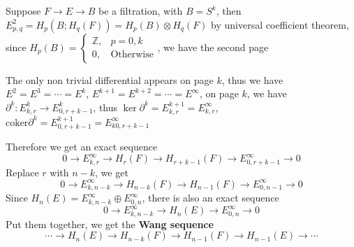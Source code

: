 \documentclass[../main.tex]{subfiles}
\begin{document}
\begin{example}
Suppose $F\to E\to B$ be a filtration, with $B=S^k$, then $E^2_{p,q}=H_p(B;H_q(F))=H_p(B)\otimes H_q(F)$ by universal coefficient theorem, since $H_p(B)=\begin{cases}
\mathbb Z, &p=0,k \\
0, &\text{Otherwise}
\end{cases}$, we have the second page
\begin{center}
\end{center}
The only non trivial differential appears on page $k$, thus we have $E^2=E^3=\cdots=E^k$, $E^{k+1}=E^{k+2}=\cdots=E^\infty$, on page $k$, we have $\partial^k:E^k_{k,r}\to E^k_{0,r+k-1}$, thus $\ker\partial^k=E^{k+1}_{k,r}=E^{\infty}_{k,r}$, $\mathrm{coker}\partial^k=E^{k+1}_{0,r+k-1}=E^{\infty}_{k0,r+k-1}$
\begin{center}
\end{center}
Therefore we get an exact sequence
\[0\to E^\infty_{k,r}\to H_r(F)\to H_{r+k-1}(F)\to E^{\infty}_{0,r+k-1}\to0\]
Replace $r$ with $n-k$, we get
\[0\to E^\infty_{k,n-k}\to H_{n-k}(F)\to H_{n-1}(F)\to E^{\infty}_{0,n-1}\to0\]
Since $H_n(E)=E^\infty_{k,n-k}\oplus E^\infty_{0,n}$, there is also an exact sequence
\[0\to E^\infty_{k,n-k}\to H_n(E)\to E^\infty_{0,n}\to0\]
Put them together, we get the \textbf{Wang sequence}
\[\cdots\to H_n(E)\to H_{n-k}(F)\to H_{n-1}(F)\to H_{n-1}(E)\to\cdots\]
\end{example}
\end{document}
